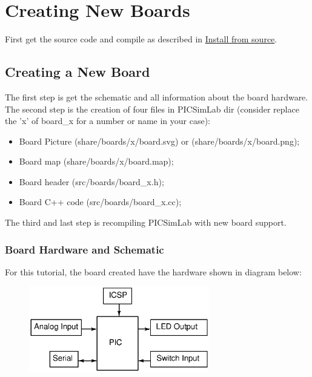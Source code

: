 \chapter{Creating New Boards}

First get the source code and compile as described in \hyperlink{def:isource}{Install from source}.

\section{Creating a New Board}

The first step is get the schematic and all information about the board hardware.
The second step is the creation of four files in PICSimLab dir (consider replace the 'x' of board\_x for a number or name in your case):
\begin{itemize}
\item Board Picture (share/boards/x/board.svg) or (share/boards/x/board.png);
\item Board map (share/boards/x/board.map);
\item Board header (src/boards/board\_x.h);
\item Board C++ code (src/boards/board\_x.cc);
\end{itemize}

The third and last step is recompiling PICSimLab with new board support.

\subsection{Board Hardware and Schematic}

For this tutorial, the board created have the hardware shown in diagram below:
\begin{figure}[H]
\center
\includegraphics[width=0.7\textwidth]{img/hb/blocks.eps} 
\end{figure} 

